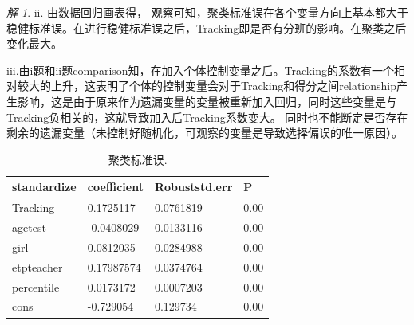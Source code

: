 \documentclass[a4paper]{ctexart}
\theoremstyle{remark}
\newtheorem*{solution}{解}
\begin{document}
\begin{itemize}
\begin{solution}
    ii. 由数据回归画表得， 观察可知，聚类标准误在各个变量方向上基本都大于稳健标准误。在进行稳健标准误之后，Tracking即是否有分班的影响。在聚类之后变化最大。

    iii.由i题和ii题comparison知，在加入个体控制变量之后。Tracking的系数有一个相对较大的上升，这表明了个体的控制变量会对于Tracking和得分之间relationship产生影响，这是由于原来作为遗漏变量的变量被重新加入回归，同时这些变量是与Tracking负相关的，这就导致加入后Tracking系数变大。
    同时也不能断定是否存在剩余的遗漏变量（未控制好随机化，可观察的变量是导致选择偏误的唯一原因）。

    \begin{table}[h]
        \centering
        \begin{threeparttable}%
            \begin{tabular}{llll}%
                \hline
                standardize & coefficient & Robuststd.err & P \\
                \hline
                Tracking &  0.1725117 & 0.0761819  & 0.00 \\
                agetest  &   -0.0408029 & 0.0133116  & 0.00\\
                girl   &  0.0812035  & 0.0284988  & 0.00\\
                etpteacher   &  0.17987574 & 0.0374764    & 0.00\\
                percentile  &  0.0173172 & 0.0007203   & 0.00\\
                cons  &  -0.729054  & 0.129734  & 0.00\\
                \hline
            \end{tabular} 
        \end{threeparttable}
        \caption{\label{font-table} 聚类标准误. }
    \end{table}


\end{solution}
\end{itemize}
\end{document}
